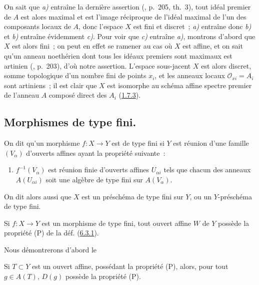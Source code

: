 On sait que \emph{a)} entraîne la dernière assertion (\cite{I-13}, p.~205, th.~3),
tout idéal premier de $A$ est alors maximal et est l'image réciproque de
l'idéal maximal de l'un des composants locaux de $A$, donc l'espace $X$ est
fini et discret~; \emph{a)} entraîne donc \emph{b)} et \emph{b)} entraîne évidemment \emph{c)}. Pour voir
que \emph{c)} entraîne \emph{a)}, montrons d'abord que $X$ est alors fini~; on peut en effet
se ramener au cas où $X$ est affine, et on sait qu'un anneau noethérien dont
tous les idéaux premiers sont maximaux est artinien (\cite{I-13}, p.~203),
d'où notre assertion. L'espace sous-jacent $X$ est alors discret, somme
topologique d'un nombre fini de points $x_i$, et les anneaux locaux
$\mathscr{O}_{xi}=A_i$ sont artiniens~; il est clair que $X$ est isomorphe au
schéma affine spectre premier de l'anneau $A$ composé direct des $A_i$
(\hyperref[I.1.7.3-fr]{1.7.3}).

\subsection{Morphismes de type fini.}
\label{subsection:I.6.3-fr}

\begin{definition}[6.3.1]
\label{I.6.3.1-fr}
On dit qu'un morphisme $f:X\to Y$ est de type fini si $Y$ est réunion
d'une famille $(V_\alpha)$ d'ouverts affines ayant la propriété suivante~:
\begin{enumerate}
  \item[\textup{(P)}] $f^{-1}(V_\alpha)$ est réunion finie d'ouverts affines
    $U_{\alpha i}$ tels que chacun des anneaux $A(U_{\alpha i})$ soit une
    algèbre de type fini sur $A(V_\alpha)$.
\end{enumerate}
On dit alors aussi que $X$ est un préschéma de type fini sur $Y$, ou un
$Y$-préschéma de type fini.
\end{definition}

\begin{proposition}[6.3.2]
\label{I.6.3.2-fr}
Si $f:X\to Y$ est un morphisme de type fini, tout ouvert affine $W$ de $Y$
possède la propriété \textup{(P)} de la déf. \textup{(\hyperref[I.6.3.1-fr]{6.3.1})}.
\end{proposition}

Nous démontrerons d'abord le

\begin{lemma}[6.3.2.1]
\label{I.6.3.2.1-fr}
Si $T\subset Y$ est un ouvert affine, possédant la propriété \textup{(P)}, alors, pour
tout $g\in A(T)$, $D(g)$ possède la propriété \textup{(P)}.
\end{lemma}

